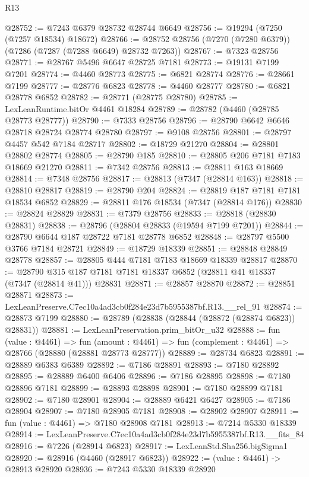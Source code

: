 \begin{lexlean}{R13}
\begin{coremodule}
@28752 := @7243 @6379 @28732 @28744 @6649
@28756 := @19294 (@7250 (@7257 @18534) @18672)
@28766 := @28752 @28756 (@7270 (@7280 @6379)) (@7286 (@7287 (@7288 @6649) @28732 @7263))
@28767 := @7323 @28756
@28771 := @28767 @5496 @6647 @28725 @7181
@28773 := @19131 @7199 @7201
@28774 := @4460 @28773
@28775 := @6821 @28774
@28776 := @28661 @7199
@28777 := @28776 @6823
@28778 := @4460 @28777
@28780 := @6821 @28778 @6852
@28782 := @28771 (@28775 @28780)
@28785 := LexLeanRuntime.bitOr @4461 @18284
@28789 := @28782 (@4460 (@28785 @28773 @28777))
@28790 := @7333 @28756
@28796 := @28790 @6642 @6646 @28718 @28724 @28774 @28780
@28797 := @9108 @28756
@28801 := @28797 @4457 @542 @7184 @28717
@28802 := @18729 @21270
@28804 := @28801 @28802 @28774
@28805 := @28790 @185
@28810 := @28805 @206 @7181 @7183 @18669 @21270
@28811 := @7342 @28756
@28813 := @28811 @163 @18669
@28814 := @7348 @28756
@28817 := @28813 (@7347 (@28814 @163))
@28818 := @28810 @28817
@28819 := @28790 @204
@28824 := @28819 @187 @7181 @7181 @18534 @6852
@28829 := @28811 @176 @18534 (@7347 (@28814 @176))
@28830 := @28824 @28829
@28831 := @7379 @28756
@28833 := @28818 (@28830 @28831)
@28838 := @28796 (@28804 @28833 (@19594 @7199 @7201))
@28844 := @28790 @6644 @187 @28722 @7181 @28778 @6852
@28848 := @28797 @5500 @3766 @7184 @28721
@28849 := @18729 @18339
@28851 := @28848 @28849 @28778
@28857 := @28805 @444 @7181 @7183 @18669 @18339 @28817
@28870 := @28790 @315 @187 @7181 @7181 @18337 @6852 (@28811 @41 @18337 (@7347 (@28814 @41))) @28831
@28871 := @28857 @28870
@28872 := @28851 @28871
@28873 := LexLeanPreserve.C7ec10a4ad3cb0f284e23d7b5955387bf.R13.__rel_91
@28874 := @28873 @7199
@28880 := @28789 (@28838 (@28844 (@28872 (@28874 @6823)) @28831))
@28881 := LexLeanPreservation.prim_bitOr_u32
@28888 := fun (value : @4461) =>
  fun (amount : @4461) => fun (complement : @4461) => @28766 (@28880 (@28881 @28773 @28777))
@28889 := @28734 @6823
@28891 := @28889 @6383 @6389
@28892 := @7186 @28891
@28893 := @7180 @28892
@28895 := @28889 @6400 @6406
@28896 := @7186 @28895
@28898 := @7180 @28896 @7181
@28899 := @28893 @28898
@28901 := @7180 @28899 @7181
@28902 := @7180 @28901
@28904 := @28889 @6421 @6427
@28905 := @7186 @28904
@28907 := @7180 @28905 @7181
@28908 := @28902 @28907
@28911 := fun (value : @4461) => @7180 @28908 @7181
@28913 := @7214 @5330 @18339
@28914 := LexLeanPreserve.C7ec10a4ad3cb0f284e23d7b5955387bf.R13.__fits_84
@28916 := @7226 (@28914 @6823)
@28917 := LexLeanStd.Sha256.bigSigma1
@28920 := @28916 (@4460 (@28917 @6823))
@28922 := (value : @4461) -> @28913 @28920
@28936 := @7243
    @5330
    @18339
    @28920

\end{coremodule}
\end{lexlean}
